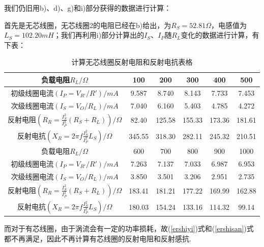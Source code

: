 \documentclass[UTF8]{ctexart}
\begin{document}
我们仍旧用b)、d)、g)和i)部分获得的数据进行计算：\par
首先是无芯线圈，无芯线圈2的电阻已经在b)给出，为$R_S=52.81\Omega$，电感值为$L_S=102.20mH$；我们再利用i)部分计算出的$I_S$、$I_P$随$R_L$变化的数据进行计算，有下表：
\begin{table}[H]\begin{center}
        \caption{计算无芯线圈反射电阻和反射电抗表格}
        \begin{tabular}{|c|c|c|c|c|c|}
            \hline
            负载电阻$R_L/\Omega$&100&200&300&400&500\\
            \hline
            初级线圈电流$(I_P=V_{R'}/R')/mA$&9.587&8.740&8.143&7.733&7.453\\
            \hline
            次级线圈电流$(I_S=V_{O}/R_L)/mA$&7.040&6.160&5.403&4.785&4.272\\            
            \hline
            反射电阻$(R_R=\frac{I_S^2}{I_P^2}(R_S+R_L))/\Omega$&82.40&125.58&155.33&173.36&181.61\\
            \hline
            反射电抗$(X_R=2\pi f\frac{I_S^2}{I_P^2}L_S)/\Omega$&345.55&318.30&282.11&245.32&210.51\\
            \hline
            \hline
            负载电阻$R_L/\Omega$&600&700&800&900&1000\\
            \hline
            初级线圈电流$(I_P=V_{R'}/R')/mA$&7.263&7.137&7.033&6.987&6.953\\
            \hline
            次级线圈电流$(I_S=V_{O}/R_L)/mA$&3.850&3.501&3.206&2.951&2.735\\ 
            \hline
            反射电阻$(R_R=\frac{I_S^2}{I_P^2}(R_S+R_L))/\Omega$&183.41&181.21&177.22&169.99&162.88\\
            \hline
            反射电抗$(X_R=2\pi f\frac{I_S^2}{I_P^2}L_S)/\Omega$&180.03&154.24&133.16&114.32&99.14\\
            \hline
        \end{tabular}
    \restoregeometry
    \end{center}\end{table}
    
而对于有芯线圈，由于涡流会有一定的功率损耗，故(\ref{ershiyi})式和(\ref{ershisan})式都不再满足，因此不再计算有芯线圈的反射电阻和反射感抗.
\end{document}

